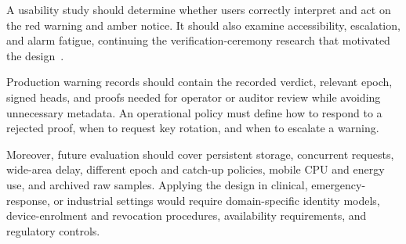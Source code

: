 A usability study should determine whether users correctly interpret and act on the red warning and
amber notice. It should also examine accessibility, escalation, and alarm fatigue, continuing the
verification-ceremony research that motivated the design~\cite{vaziripour2017}.

Production warning records should contain the recorded verdict, relevant epoch, signed heads, and
proofs needed for operator or auditor review while avoiding unnecessary metadata. An operational
policy must define how to respond to a rejected proof, when to request key rotation, and when to
escalate a warning.

Moreover, future evaluation should cover persistent storage, concurrent requests, wide-area delay,
different epoch and catch-up policies, mobile CPU and energy use, and archived raw samples. Applying
the design in clinical, emergency-response, or industrial settings would require domain-specific
identity models, device-enrolment and revocation procedures, availability requirements, and regulatory
controls.
